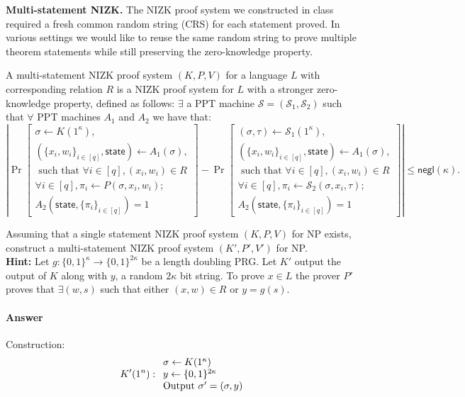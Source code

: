 \begin{exercise}
\textbf{Multi-statement NIZK.} The NIZK proof system we constructed in class required a fresh common random string (CRS) for each statement proved. In various settings we would like to reuse the same random string to prove multiple theorem statements while still preserving the zero-knowledge property.
    
    A multi-statement NIZK proof system $(K,P,V)$ for a language $L$ with corresponding relation $R$ is a NIZK proof system for $L$ with a stronger zero-knowledge property, defined as follows: $\exists$ a PPT machine $\mathcal{S} = (\mathcal{S}_1,\mathcal{S}_2)$ such that $\forall$ PPT machines $A_1$ and $A_2$ we have that:
    \[\left|\Pr\left[\begin{split}\sigma \gets K(1^\kappa),\\ (\{x_i,w_i\}_{i \in [q]},\textsf{state}) \gets A_1(\sigma),\\ \text{ such that } \forall i \in [q], (x_i,w_i)\in R\\\forall i \in [q],  \pi_i \gets P(\sigma, x_i,w_i);\\
    A_2(\textsf{state}, \{\pi_i\}_{i \in [q]}) =1\end{split}\right]
    -
    \Pr\left[\begin{split}(\sigma,\tau) \gets \mathcal{S}_1(1^\kappa),\\ (\{x_i,w_i\}_{i \in [q]},\textsf{state}) \gets A_1(\sigma),\\\text{ such that } \forall i \in [q], (x_i,w_i)\in R\\\forall i \in [q],  \pi_i \gets \mathcal{S}_2(\sigma, x_i,\tau);\\ A_2(\textsf{state}, \{\pi_i\}_{i \in [q]})=1\end{split}\right]\right|
    \leq \textsf{negl}(\kappa).
    \]
    
    Assuming that a single statement NIZK proof system $(K,P,V)$ for NP exists, construct a multi-statement NIZK proof system $(K',P',V')$ for NP.\\
\textbf{Hint:} Let $g: \{0,1\}^\kappa \rightarrow \{0,1\}^{2\kappa}$ be a length doubling PRG. Let $K'$ output the output of $K$ along with $y$, a random $2\kappa$ bit string. To prove $x \in L$ the prover $P'$ proves that $\exists (w,s)$ such that either $(x,w)\in R$ or $y = g(s)$.
\end{exercise}


\paragraph{Answer}
Construction:
\[ K'(1^n): 
\begin{array}{l l} 
\sigma \leftarrow K(1^{\kappa}) \\  
y \leftarrow \{0,1\}^{2\kappa} \\
\text{Output } \sigma' = (\sigma, y) \\
\end{array} \]

